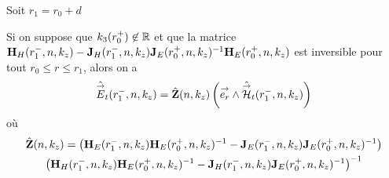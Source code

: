     Soit \(r_1 = r_0 + d\)

    \begin{prop}
      Si on suppose que \(k_3(r_0^+) \not \in \mathbb R\) et que la matrice \(\mathbf{H}_{H}(r_1^-,n,k_z) - \mathbf{J}_{H}(r_1^-,n,k_z)\mathbf{J}_{E}(r_0^+,n,k_z)^{-1}\mathbf{H}_{E}(r_0^+,n,k_z)\) est inversible pour tout \(r_0 \le r \le r_1\), alors on a 
      \begin{equation*}
        \hat {{\overset{\rightarrow}{E}}}_t(r_1^-,n,k_z) = \hat {\mathbf{Z}}(n,k_z) \left({\overset{\rightarrow}{e_r}}\wedge \hat {{\overset{\rightarrow}{\mathcal{H}}}}_t(r_1^-,n,k_z)\right)
      \end{equation*}
      où
      \begin{multline*}
        \hat {\mathbf{Z}}(n,k_z) =
        \left(\mathbf{H}_{E}(r_1^-,n,k_z)\mathbf{H}_{E}(r_0^+,n,k_z)^{-1} - \mathbf{J}_{E}(r_1^-,n,k_z)\mathbf{J}_{E}(r_0^+,n,k_z)^{-1}\right)\\
        \left(\mathbf{H}_{H}(r_1^-,n,k_z)\mathbf{H}_{E}(r_0^+,n,k_z)^{-1} - \mathbf{J}_{H}(r_1^-,n,k_z)\mathbf{J}_{E}(r_0^+,n,k_z)^{-1}\right)^{-1}
      \end{multline*}
    \end{prop}

